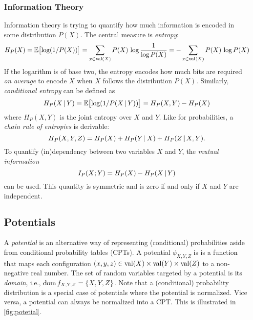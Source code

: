 			\subsubsection{Information Theory}
				Information theory is trying to quantify how much information is encoded in some distribution \(P(X)\). The central measure is \emph{entropy}:
				\begin{equation}
					H_P(X)
						= \mathbb{E}\bigl[ \log(1/P(X)) \bigr]
						= \sum_{x \in \operatorname{val}(X)} P(X) \,\log \frac{1}{\log P(X)}
						= -\sum_{x \in \operatorname{val}(X)} P(X) \,\log P(X)
				\end{equation}
				If the logarithm is of base two, the entropy encodes how much bits are required \emph{on average} to encode \(X\) when \(X\) follows the distribution \(P(X)\). Similarly, \emph{conditional entropy} can be defined as
				\begin{equation}
					H_P(X \,\vert\, Y)
						= \mathbb{E}\bigl[ \log(1/P(X \,\vert\, Y)) \bigr]
						= H_P(X, Y) - H_P(X)
				\end{equation}
				where \( H_P(X, Y) \) is the joint entropy over \(X\) and \(Y\). Like for probabilities, a \emph{chain rule of entropies} is derivable:
				\begin{equation}
					H_P(X, Y, Z) = H_P(X) + H_P(Y \,\vert\, X) + H_P(Z \,\vert\, X, Y).
				\end{equation}
				To quantify (in)dependency between two variables \(X\) and \(Y\), the \emph{mutual information}
				\begin{equation}
					I_P(X; Y) = H_P(X) - H_P(X \,\vert\, Y)
				\end{equation}
				can be used. This quantity is symmetric and is zero if and only if \(X\) and \(Y\) are independent.

		\subsection{Potentials}
			A \emph{potential} is an alternative way of representing (conditional) probabilities aside from conditional probability tables (CPTs). A potential \(\phi_{X, Y, Z}\) is is a function that maps each configuration \( (x, y, z) \in \operatorname{val}(X) \times \operatorname{val}(Y) \times \operatorname{val}(Z) \) to a non-negative real number. The set of random variables targeted by a potential is its \emph{domain}, i.e., \( \operatorname{dom} f_{X, Y, Z} = \{ X, Y, Z \} \). Note that a (conditional) probability distribution is a special case of potentials where the potential is normalized. Vice versa, a potential can always be normalized into a CPT. This is illustrated in \autoref{fig:potetial}.

